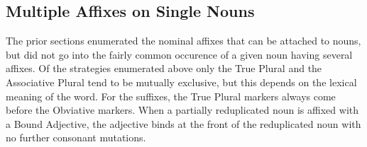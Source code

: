   \subsection{Multiple Affixes on Single Nouns}
  The prior sections enumerated the nominal affixes that can be attached to nouns, but did not go into the fairly common occurence of a given noun having several affixes. Of the strategies enumerated above only the True Plural and the Associative Plural tend to be mutually exclusive, but this depends on the lexical meaning of the word. For the suffixes, the True Plural markers always come before the Obviative markers. When a partially reduplicated noun is affixed with a Bound Adjective, the adjective binds at the front of the reduplicated noun with no further consonant mutations.
